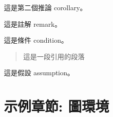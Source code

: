 \documentclass[
    writingLanguage=chinese, %
    addPageTitle=on,  %
    addDeclaration=on, %
    addMUSTlog=off, %
    addFigTOC=on, %
    addTabTOC=on, %
    refIndent=off, %
    printMod=off, %
]{must}
\begin{document}
\begin{corollary}
這是第二個推論 corollary。
\end{corollary}

\begin{remark}
這是註解 remark。
\end{remark}



\begin{condition}
這是條件 condition。
\end{condition}

 \begin{quote}
     這是一段引用的段落
 \end{quote}

\begin{assumption}
這是假設 assumption。
\end{assumption}





\chapter{示例章節: 圖環境}
\end{document}
